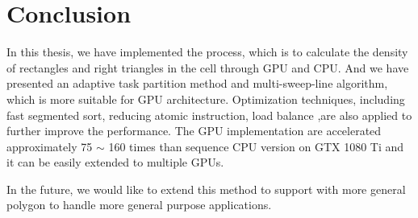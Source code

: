 \chapter{Conclusion}
\label{chap:conclusion}
In this thesis, we have implemented the process, which is to calculate the density of rectangles and right triangles in the cell through GPU and CPU. And we have presented an adaptive task partition method and multi-sweep-line algorithm, which is more suitable for GPU architecture. Optimization techniques, including fast segmented sort, reducing atomic instruction, load balance ,are also applied to further improve the performance. The GPU implementation are accelerated approximately 75 $\sim$ 160 times than sequence CPU version on GTX 1080 Ti and it can be easily extended to multiple GPUs.

In the future, we would like to extend this method to support with more general polygon to handle more general purpose applications.
